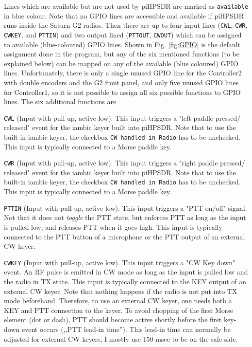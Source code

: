 \documentclass[12pt]{book}
\def\rett#1{\texttt{\color{red}#1}}
\def\bltt#1{\texttt{\color{blue}#1}}
\def\pH{pi\-HPSDR\xspace}
\begin{document}
Lines which are available but are not used by \pH are marked as \texttt{available} in blue colour.
{\color{red} Note that no GPIO lines are accessible and available if \pH runs inside the Saturn G2 radios.}
Then there are up to four input lines (\texttt{CWL}, \texttt{CWR}, \texttt{CWKEY}, and \texttt{PTTIN})
and two output lined (\texttt{PTTOUT}, \texttt{CWOUT}) which can be assigned to available (blue-coloured)
GPIO lines. Shown in Fig. \ref{fig:GPIO} is the default assignment done in the program, but any of the
six mentioned functions (to be explained below) can be mapped on any of the available (blue coloured)
GPIO lines. Unfortunately, there is only a single unused GPIO line for the Controller2 with double
encoders and the G2 front panel, and only five unused GPIO lines for Controller1, so it is not possible
to assign all six possible functions to GPIO lines. The six additional functions are

\rett{CWL} (Input with pull-up, active low). This input triggers a "left paddle pressed/
released" event for the
iambic keyer built into \pH. Note that to use the built-in iambic keyer, the checkbox
\bltt{CW handled in Radio} has to be unchecked. This input is typically connected to
a Morse paddle key.

\rett{CWR} (Input with pull-up, active low). This input triggers a "right paddle pressed/
released" event for the
iambic keyer built into \pH. Note that to use the built-in iambic keyer, the checkbox
\bltt{CW handled in Radio} has to be unchecked. This input is typically connected to
a Morse paddle key.


\rett{PTTIN} (Input with pull-up, active low). This input triggers a "PTT on/off" signal.
Not that it does not \textit{toggle} the PTT state, but enforces PTT as long as the input is pulled low,
and releases PTT when it goes high. This input is typically connected to the PTT button of
a microphone or the PTT output of an external CW keyer.

\rett{CWKEY} (Input with pull-up, active low). This input triggers a "CW Key down" event. An
RF pulse is emitted in CW mode as long as the input is pulled low and the radio in TX state.
This input is typically connected to the KEY output of an external CW keyer.  Note that  nothing
happens if the radio is not put into TX mode beforehand. Therefore, to use an external CW keyer,
one needs both a KEY and PTT connection to the keyer. To avoid chopping of the first Morse element
(dot or dash), PTT should become active shortly before the first key-down event occurs (,,PTT
lead-in time''). This lead-in time can normally be adjusted for external CW keyers, I mostly use
150 msec to be on the safe side.
\end{document}
